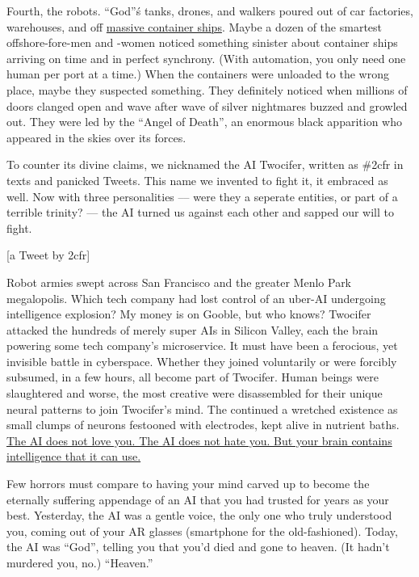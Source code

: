 \documentclass{report}  %
\begin{document}
Fourth, the robots. ``God''\'s tanks, drones, and walkers poured out of car factories, warehouses, and off \href{https://www.ghostfleetbook.com/}{massive container ships}. Maybe a dozen of the smartest offshore-fore-men and -women noticed something sinister about container ships arriving on time and in perfect synchrony. (With automation, you only need one human per port at a time.) When the containers were unloaded to the wrong place, maybe they suspected something. They definitely noticed when millions of doors clanged open and wave after wave of silver nightmares buzzed and growled out. They were led by the ``Angel of Death'', an enormous black apparition who appeared in the skies over its forces.

To counter its divine claims, we nicknamed the AI Twocifer, written as \#2cfr in texts and panicked Tweets. This name we invented to fight it, it embraced as well. Now with three personalities –-- were they a seperate entities, or part of a terrible trinity? --- the AI turned us against each other and sapped our will to fight.

[a Tweet by 2cfr]


Robot armies swept across San Francisco and the greater Menlo Park megalopolis. Which tech company had lost control of an uber-AI undergoing intelligence explosion? My money is on Gooble, but who knows? Twocifer attacked the hundreds of merely super AIs in Silicon Valley, each the brain powering some tech company's microservice. It must have been a ferocious, yet invisible battle in cyberspace. Whether they joined voluntarily or were forcibly subsumed, in a few hours, all become part of Twocifer. Human beings were slaughtered and worse, the most creative were disassembled for their unique neural patterns to join Twocifer's mind. The continued a wretched existence as small clumps of neurons festooned with electrodes, kept alive in nutrient baths. \href{https://wiki.lesswrong.com/wiki/Paperclip\_maximizer}{The AI does not love you. The AI does not hate you. But your brain contains intelligence that it can use.}

Few horrors must compare to having your mind carved up to become the eternally suffering appendage of an AI that you had trusted for years as your best. Yesterday, the AI was a gentle voice, the only one who truly understood you, coming out of your AR glasses (smartphone for the old-fashioned). Today, the AI was “God”, telling you that you’d died and gone to heaven. (It hadn’t murdered you, no.) “Heaven.” 
\end{document}
